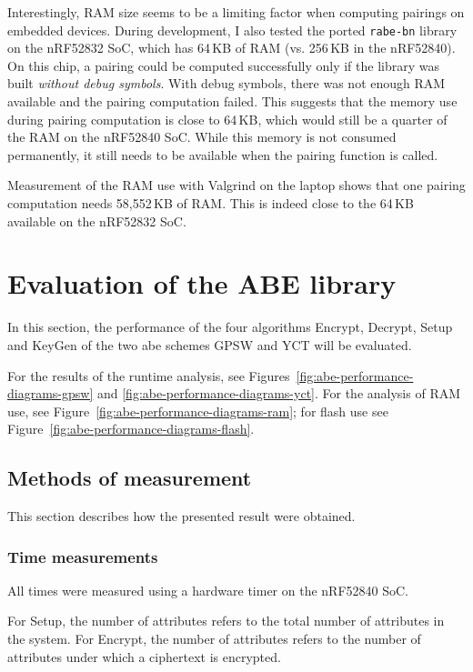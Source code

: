 Interestingly, RAM size seems to be a limiting factor when computing pairings on embedded devices.
During development, I also tested the ported \texttt{rabe-bn} library on the nRF52832 SoC, which has 64\,KB of RAM (vs. 256\,KB in the nRF52840). 
On this chip, a pairing could be computed successfully only if the library was built \emph{without debug symbols}.
With debug symbols, there was not enough RAM available and the pairing computation failed.
This suggests that the memory use during pairing computation is close to 64\,KB, which would still be a quarter of the RAM on the nRF52840 SoC.
While this memory is not consumed permanently, it still needs to be available when the pairing function is called.

Measurement of the RAM use with Valgrind on the laptop shows that one pairing computation needs 58,552\,KB of RAM.
This is indeed close to the 64\,KB available on the nRF52832 SoC.

\section{Evaluation of the ABE library}\label{sec:abe-performance}

In this section, the performance of the four algorithms Encrypt, Decrypt, Setup and KeyGen of the two \acrshort{abe} schemes GPSW and YCT will be evaluated.

For the results of the runtime analysis, see Figures~\ref{fig:abe-performance-diagrams-gpsw} and \ref{fig:abe-performance-diagrams-yct}. 
For the analysis of RAM use, see Figure~\ref{fig:abe-performance-diagrams-ram}; for flash use see Figure~\ref{fig:abe-performance-diagrams-flash}. 


\subsection{Methods of measurement}
This section describes how the presented result were obtained.

\subsubsection{Time measurements}


All times were measured using a hardware timer on the nRF52840 SoC.

For Setup, the number of attributes refers to the total number of attributes in the system.
For Encrypt, the number of attributes refers to the number of attributes under which a ciphertext is encrypted.

